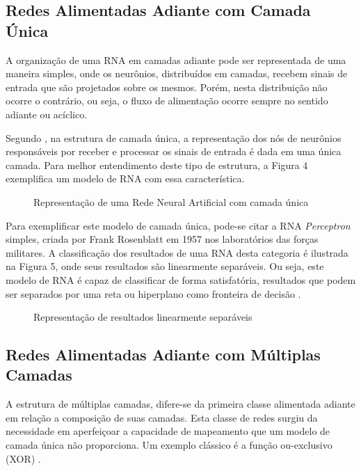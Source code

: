 \subsection{Redes Alimentadas Adiante com Camada Única}
A organização de uma RNA em camadas adiante pode ser representada de uma maneira simples, onde os neurônios, distribuídos em camadas, recebem sinais de entrada que são projetados sobre os mesmos. Porém, nesta distribuição não ocorre o contrário, ou seja, o fluxo de alimentação ocorre sempre no sentido adiante ou acíclico.
 
Segundo , na estrutura de camada única, a representação dos nós de neurônios responsáveis por receber e processar os sinais de entrada é dada em uma única camada. Para melhor entendimento deste tipo de estrutura, a Figura 4 exemplifica um modelo de RNA com essa característica.

\begin{figure}[h]
	\centering
	\caption{Representação de uma Rede Neural Artificial com camada única}
	\label{exec-rna-camada-unica}
\end{figure}

Para exemplificar este modelo de camada única, pode-se citar a RNA \textit{Perceptron} simples, criada por Frank Rosenblatt em 1957 nos laboratórios das forças militares. A classificação dos resultados de uma RNA desta categoria é ilustrada na Figura 5, onde seus resultados são linearmente separáveis. Ou seja, este modelo de RNA é capaz de classificar de forma satisfatória, resultados que podem ser separados por uma reta ou hiperplano como fronteira de decisão \cite{haykin2009}.

\begin{figure}[h]
	\centering
	\caption{Representação de resultados linearmente separáveis}
	\label{exec-linearmente-separavel}
\end{figure}

\subsection{Redes Alimentadas Adiante com Múltiplas Camadas}
A estrutura de múltiplas camadas, difere-se da primeira classe alimentada adiante em relação a composição de suas camadas. Esta classe de redes surgiu da necessidade em aperfeiçoar a capacidade de mapeamento que um modelo de camada única não proporciona. Um exemplo clássico é a função ou-exclusivo (XOR) \cite{haykin2009}.


